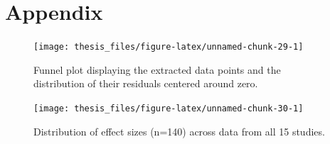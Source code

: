 \documentclass[12pt,twoside]{reedthesis}
\begin{document}
\appendix

\hypertarget{appendix}{%
\chapter*{Appendix}\label{appendix}}
\begin{figure}

{\centering \texttt{[image: thesis\_files/figure-latex/unnamed-chunk-29-1]} 

}

\caption[Funnel plot]{Funnel plot displaying the extracted data points and the distribution of their residuals centered around zero.}\label{fig:unnamed-chunk-29}
\end{figure}
\clearpage
\begin{figure}

{\centering \texttt{[image: thesis\_files/figure-latex/unnamed-chunk-30-1]} 

}

\caption[Histogram of effect sizes]{Distribution of effect sizes (n=140) across data from all 15 studies.}\label{fig:unnamed-chunk-30}
\end{figure}
\end{document}
